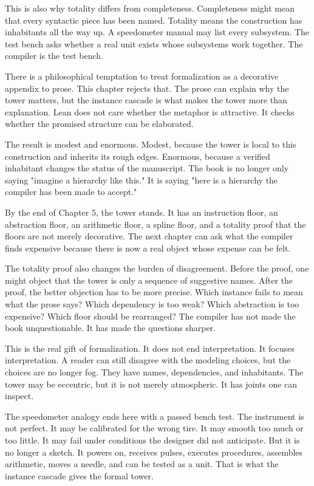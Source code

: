 This is also why totality differs from completeness. Completeness might mean
that every syntactic piece has been named. Totality means the construction has
inhabitants all the way up. A speedometer manual may list every subsystem. The
test bench asks whether a real unit exists whose subsystems work together. The
compiler is the test bench.

There is a philosophical temptation to treat formalization as a decorative
appendix to prose. This chapter rejects that. The prose can explain why the
tower matters, but the instance cascade is what makes the tower more than
explanation. Lean does not care whether the metaphor is attractive. It checks
whether the promised structure can be elaborated.

The result is modest and enormous. Modest, because the tower is local to this
construction and inherits its rough edges. Enormous, because a verified
inhabitant changes the status of the manuscript. The book is no longer only
saying "imagine a hierarchy like this." It is saying "here is a hierarchy the
compiler has been made to accept."

By the end of Chapter 5, the tower stands. It has an instruction floor, an
abstraction floor, an arithmetic floor, a spline floor, and a totality proof
that the floors are not merely decorative. The next chapter can ask what the
compiler finds expensive because there is now a real object whose expense can
be felt.

The totality proof also changes the burden of disagreement. Before the proof,
one might object that the tower is only a sequence of suggestive names. After
the proof, the better objection has to be more precise. Which instance fails
to mean what the prose says? Which dependency is too weak? Which abstraction is
too expensive? Which floor should be rearranged? The compiler has not made the
book unquestionable. It has made the questions sharper.

This is the real gift of formalization. It does not end interpretation. It
focuses interpretation. A reader can still disagree with the modeling choices,
but the choices are no longer fog. They have names, dependencies, and
inhabitants. The tower may be eccentric, but it is not merely atmospheric. It
has joints one can inspect.

The speedometer analogy ends here with a passed bench test. The instrument is
not perfect. It may be calibrated for the wrong tire. It may smooth too much or
too little. It may fail under conditions the designer did not anticipate. But
it is no longer a sketch. It powers on, receives pulses, executes procedures,
assembles arithmetic, moves a needle, and can be tested as a unit. That is what
the instance cascade gives the formal tower.

